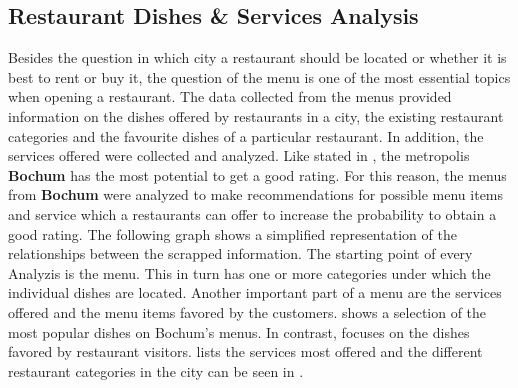 \subsection{Restaurant Dishes \& Services Analysis}
\label{subsec:menu}
Besides the question in which city a restaurant should be located or whether it is best to rent or buy it,
the question of the menu is one of the most essential topics when opening a restaurant.
\newline
The data collected from the menus provided information on the dishes offered by restaurants in a city,
the existing restaurant categories and the favourite dishes of a particular restaurant.
In addition, the services offered were collected and analyzed.
\newline
Like stated in , the metropolis \textbf{Bochum} has the most potential to get a good rating.
For this reason, the menus from \textbf{Bochum} were analyzed to make recommendations for possible menu items and service which a restaurants can offer
to increase the probability to obtain a good rating.
\newline
The following graph shows a simplified representation of the relationships between the scrapped information.
The starting point of every Analyzis is the menu.
This in turn has one or more categories under which the individual dishes are located.
Another important part of a menu are the services offered and the menu items favored by the customers.
\newline
{} shows a selection of the most popular dishes on Bochum's menus.
In contrast,  focuses on the dishes favored by restaurant visitors.
 lists the services most offered and the different restaurant categories in the city can be seen in .
